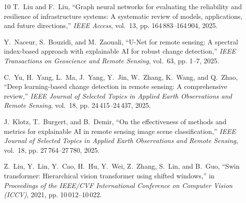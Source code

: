 \documentclass[conference]{IEEEtran}
\begin{document}
{\begin{thebibliography}{10}
T.~Liu and F.~Liu, ``Graph neural networks for evaluating the reliability and
  resilience of infrastructure systems: {A} systematic review of models,
  applications, and future directions,'' \emph{IEEE Access}, vol.~13, pp.
  164\,883--164\,904, 2025.

Y.~Naceur, S.~Bouzidi, and M.~Zaouali, ``{U-Net} for remote sensing: {A}
  spectral index-based approach with explainable {AI} for robust change
  detection,'' \emph{IEEE Transactions on Geoscience and Remote Sensing},
  vol.~63, pp. 1--7, 2025.

C.~Yu, H.~Yang, L.~Ma, J.~Yang, Y.~Jin, W.~Zhang, K.~Wang, and Q.~Zhao, ``Deep
  learning-based change detection in remote sensing: {A} comprehensive
  review,'' \emph{IEEE Journal of Selected Topics in Applied Earth Observations
  and Remote Sensing}, vol.~18, pp. 24\,415--24\,437, 2025.

J.~Klotz, T.~Burgert, and B.~Demir, ``On the effectiveness of methods and
  metrics for explainable {AI} in remote sensing image scene classification,''
  \emph{IEEE Journal of Selected Topics in Applied Earth Observations and
  Remote Sensing}, vol.~18, pp. 27\,764--27\,780, 2025.

Z.~Liu, Y.~Lin, Y.~Cao, H.~Hu, Y.~Wei, Z.~Zhang, S.~Lin, and B.~Guo, ``Swin
  transformer: {Hierarchical} vision transformer using shifted windows,'' in
  \emph{Proceedings of the IEEE/CVF International Conference on Computer Vision
  (ICCV)}, 2021, pp. 10\,012--10\,022.

\end{thebibliography}}
\end{document}
